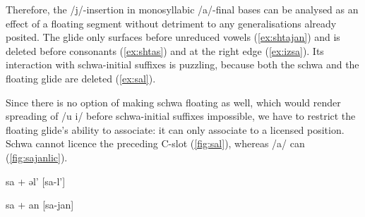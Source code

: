 \documentclass[a4paper, 12pt]{article}
\begin{document}
	\noindent Therefore, the /j/-insertion in monosyllabic /a/-final bases can be analysed as an effect of a floating segment without detriment to any generalisations already posited. The glide only surfaces before unreduced vowels (\ref{ex:shtajan}) and is deleted before consonants (\ref{ex:shtas}) and at the right edge (\ref{ex:izsa}). Its interaction with schwa-initial suffixes is puzzling, because both the schwa and the floating glide are deleted (\ref{ex:sal}).
	
	Since there is no option of making schwa floating as well, which would render spreading of /u i/ before schwa-initial suffixes impossible, we have to restrict the floating glide's ability to associate: it can only associate to a licensed position. Schwa cannot licence the preceding C-slot (\ref{fig:sal}), whereas /a/ can (\ref{fig:sajanlic}).
	
\begin{minipage}[t]{.45\linewidth}
			\ex\label{fig:sal} sa + əl' {[sa-l']} \\
			\xe
\end{minipage}
\hfill
\begin{minipage}[t]{.45\linewidth}
			\ex\label{fig:sajanlic} sa + an {[sa-jan]} \\
			\xe
\end{minipage}	
	
\end{document}
